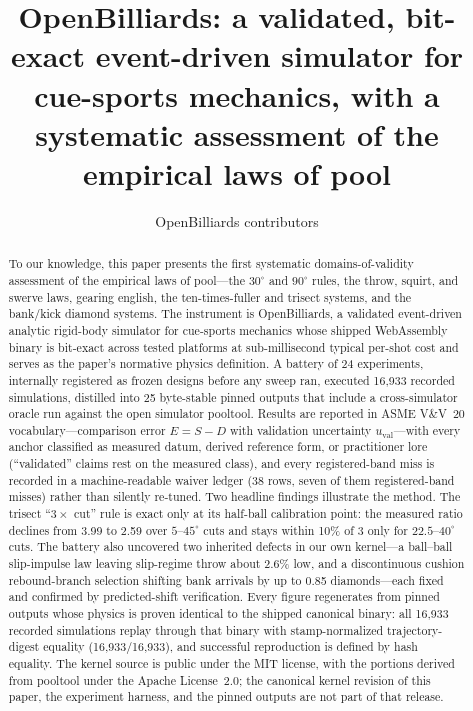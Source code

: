 \documentclass[review,12pt,authoryear]{elsarticle}
\begin{document}
\begin{frontmatter}

\title{OpenBilliards: a validated, bit-exact event-driven simulator for
cue-sports mechanics, with a systematic assessment of the empirical laws of
pool}

\author{OpenBilliards contributors}

\begin{abstract}
To our knowledge, this paper presents the first systematic
domains-of-validity assessment of the empirical laws of pool---the
$30^\circ$ and $90^\circ$ rules, the throw, squirt, and swerve laws,
gearing english, the ten-times-fuller and trisect systems, and the
bank/kick diamond systems. The instrument is OpenBilliards, a validated
event-driven analytic rigid-body simulator for cue-sports mechanics
whose shipped WebAssembly binary is bit-exact across tested platforms at
sub-millisecond typical per-shot cost and serves as the paper's
normative physics definition. A battery of 24
experiments, internally registered as frozen designs before any sweep
ran,
executed 16{,}933 recorded simulations, distilled into 25 byte-stable
pinned outputs that include a cross-simulator oracle run against the
open simulator pooltool. Results are reported in ASME V\&V~20
vocabulary---comparison error $E = S - D$ with validation uncertainty
$u_{\mathrm{val}}$---with every anchor classified as measured datum,
derived reference form, or practitioner lore (``validated'' claims rest
on the measured class), and every registered-band miss is recorded in a
machine-readable waiver ledger (38 rows, seven of them registered-band
misses) rather than silently re-tuned.
Two headline findings illustrate the method. The trisect ``$3\times$
cut'' rule is exact only at its half-ball calibration point: the
measured ratio declines from 3.99 to 2.59 over $5$--$45^\circ$ cuts and
stays within 10\% of 3 only for $22.5$--$40^\circ$ cuts. The battery
also uncovered two inherited defects in our own kernel---a ball--ball
slip-impulse law leaving slip-regime throw about 2.6\% low, and a
discontinuous cushion rebound-branch selection shifting bank arrivals
by up to 0.85 diamonds---each fixed and confirmed by predicted-shift
verification. Every figure regenerates from pinned outputs whose physics
is proven identical to the shipped canonical binary: all 16{,}933
recorded simulations replay through that binary with stamp-normalized
trajectory-digest equality (16{,}933/16{,}933), and successful
reproduction is defined by hash equality. The kernel source is public
under the MIT license, with the portions derived from pooltool under the
Apache License~2.0; the canonical kernel revision of this paper, the
experiment harness, and the pinned outputs are not part of that release.
\end{abstract}


\end{frontmatter}
\end{document}
